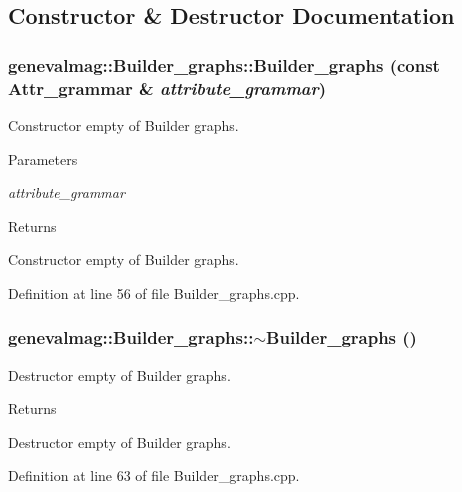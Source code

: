 \subsection{Constructor \& Destructor Documentation}
\hypertarget{classgenevalmag_1_1Builder__graphs_a6220015a296aed77686fd9382e2917e3}{
\subsubsection[{Builder\_\-graphs}]{\setlength{\rightskip}{0pt plus 5cm}genevalmag::Builder\_\-graphs::Builder\_\-graphs (const {\bf Attr\_\-grammar} \& {\em attribute\_\-grammar})}}
\label{classgenevalmag_1_1Builder__graphs_a6220015a296aed77686fd9382e2917e3}
Constructor empty of Builder graphs. 
\begin{DoxyParams}{Parameters}
\item[{\em attribute\_\-grammar}]\end{DoxyParams}
\begin{DoxyReturn}{Returns}

\end{DoxyReturn}
Constructor empty of Builder graphs. 

Definition at line 56 of file Builder\_\-graphs.cpp.

\hypertarget{classgenevalmag_1_1Builder__graphs_a1185fa86f07038e594e0292a7d6c5f36}{
\subsubsection[{$\sim$Builder\_\-graphs}]{\setlength{\rightskip}{0pt plus 5cm}genevalmag::Builder\_\-graphs::$\sim$Builder\_\-graphs ()}}
\label{classgenevalmag_1_1Builder__graphs_a1185fa86f07038e594e0292a7d6c5f36}
Destructor empty of Builder graphs. \begin{DoxyReturn}{Returns}

\end{DoxyReturn}
Destructor empty of Builder graphs. 

Definition at line 63 of file Builder\_\-graphs.cpp.



